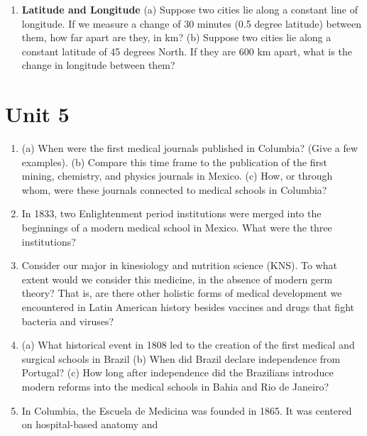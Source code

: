 \documentclass[10pt]{article}
\begin{document}
\begin{enumerate}
\item \textbf{Latitude and Longitude} (a) Suppose two cities lie along a constant line of longitude.  If we measure a change of 30 minutes (0.5 degree latitude) between them, how far apart are they, in km? (b) Suppose two cities lie along a constant latitude of 45 degrees North.  If they are 600 km apart, what is the change in longitude between them? \\ \vspace{1.5cm}
\end{enumerate}

\section{Unit 5}

\begin{enumerate}
\item (a) When were the first medical journals published in Columbia? (Give a few examples). (b) Compare this time frame to the publication of the first mining, chemistry, and physics journals in Mexico. (c) How, or through whom, were these journals connected to medical schools in Columbia? \\ \vspace{1.5cm}
\item In 1833, two Enlightenment period institutions were merged into the beginnings of a modern medical school in Mexico. What were the three institutions? \\ \vspace{1cm}
\item Consider our major in kinesiology and nutrition science (KNS). To what extent would we consider this medicine, in the absence of modern germ theory?  That is, are there other holistic forms of medical development we encountered in Latin American history besides vaccines and drugs that fight bacteria and viruses? \\ \vspace{1.75cm}
\item (a) What historical event in 1808 led to the creation of the first medical and surgical schools in Brazil (b) When did Brazil declare independence from Portugal? (c) How long after independence did the Brazilians
introduce modern reforms into the medical schools in Bahia and Rio de Janeiro? \\ \vspace{1.75cm}
\item In Columbia, the Escuela de Medicina was founded in 1865. It was centered on hospital-based anatomy and

\end{enumerate}
\end{document}
